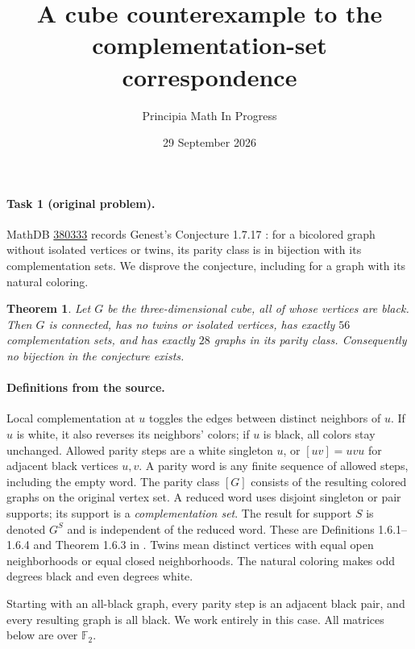 \documentclass[11pt]{article}
\title{A cube counterexample to the complementation-set correspondence}
\author{Principia Math In Progress}
\date{29 September 2026}
\newtheorem{theorem}{Theorem}
\newcommand{\F}{\mathbb F_2}
\begin{document}
\maketitle

\paragraph{Task 1 (original problem).}
MathDB \href{https://mathdb.com/p/380333}{380333} records
Genest's Conjecture 1.7.17 \cite[p.~41]{Genest}: for a bicolored graph
without isolated vertices or twins, its parity class is in bijection
with its complementation sets. We disprove the conjecture, including
for a graph with its natural coloring.

\begin{theorem}\label{main}
Let \(G\) be the three-dimensional cube, all of whose vertices are black.
Then \(G\) is connected, has no twins or isolated vertices, has exactly
\(56\) complementation sets, and has exactly \(28\) graphs in its parity
class. Consequently no bijection in the conjecture exists.
\end{theorem}

\paragraph{Definitions from the source.}
Local complementation at \(u\) toggles the edges between distinct
neighbors of \(u\). If \(u\) is white, it also reverses its neighbors'
colors; if \(u\) is black, all colors stay unchanged.
Allowed parity steps are a white singleton \(u\), or
\([uv]=uvu\) for adjacent black vertices \(u,v\).
A parity word is any finite sequence of allowed steps, including the
empty word. The parity class \([G]\) consists of the resulting colored
graphs on the original vertex set.
A reduced word uses disjoint singleton or pair supports; its support
is a \emph{complementation set}. The result for support \(S\) is denoted
\(G^S\) and is independent of the reduced word.
These are Definitions 1.6.1--1.6.4 and Theorem 1.6.3 in \cite{Genest}.
Twins mean distinct vertices with equal open neighborhoods or equal
closed neighborhoods. The natural coloring makes odd degrees black
and even degrees white.

Starting with an all-black graph, every parity step is an adjacent
black pair, and every resulting graph is all black. We work entirely
in this case. All matrices below are over \(\F\).
\end{document}
